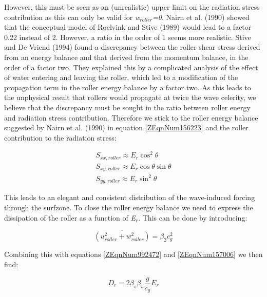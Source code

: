 \documentclass{article}
\begin{document}
\noindent However, this must be seen as an (unrealistic) upper limit on the radiation stress contribution as this can only be valid for \textit{w${}_{roller}$=0}. Nairn et al. (1990) showed that the conceptual model of Roelvink and Stive (1989) would lead to a factor 0.22 instead of 2. However, a ratio in the order of 1 seems more realistic. Stive and De Vriend (1994) found a discrepancy between the roller shear stress derived from an energy balance and that derived from the momentum balance, in the order of a factor two. They explained this by a complicated analysis of the effect of water entering and leaving the roller, which led to a modification of the propagation term in the roller energy balance by a factor two. As this leads to the unphysical result that rollers would propagate at twice the wave celerity, we believe that the discrepancy must be sought in the ratio between roller energy and radiation stress contribution. Therefore we stick to the roller energy balance suggested by Nairn et al. (1990) in equation \eqref{ZEqnNum156223} and the roller contribution to the radiation stress:

\noindent 
\begin{equation} \label{ZEqnNum156223} 
\begin{array}{l} {S_{xx,roller} \approx E_{r} \cos ^{2} \theta } \\ {S_{xy,roller} \approx E_{r} \cos \theta \sin \theta } \\ {S_{yy,roller} \approx E_{r} \sin ^{2} \theta } \end{array} 
\end{equation} 


\noindent This leads to an elegant and consistent distribution of the wave-induced forcing through the surfzone. To close the roller energy balance we need to express the dissipation of the roller as a function of \textit{E${}_{r}$}. This can be done by introducing:

\noindent 
\begin{equation} \label{ZEqnNum157006} 
\overline{\left(u_{roller}^{2} +w_{roller}^{2} \right)}=\beta _{2} c_{g} ^{2}  
\end{equation} 


\noindent Combining this with equations \eqref{ZEqnNum992472} and \eqref{ZEqnNum157006} we then find:

\noindent 
\begin{equation} \label{2.45)} 
D_{r} =2\beta _{s} \beta _{u} \frac{g}{c_{g} } E_{r}  
\end{equation} 
\end{document}
